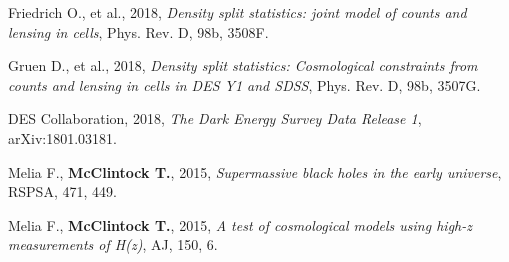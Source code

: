 \documentclass{res}
\begin{document}
\begin{resume}
Friedrich O., et al., 2018, {\it Density split statistics: joint model of counts and lensing in cells}, Phys. Rev. D, 98b, 3508F.

Gruen D., et al., 2018, {\it Density split statistics: Cosmological constraints from counts and lensing in cells in DES Y1 and SDSS}, Phys. Rev. D, 98b, 3507G.

DES Collaboration, 2018, {\it The Dark Energy Survey Data Release 1}, arXiv:1801.03181.

Melia F., {\bf McClintock T.}, 2015, {\it Supermassive black holes in the early universe}, RSPSA, 471, 449.

Melia F., {\bf McClintock T.}, 2015, {\it A test of cosmological models using high-z measurements of H(z)}, AJ, 150, 6.
 
\end{resume} 
\end{document}
